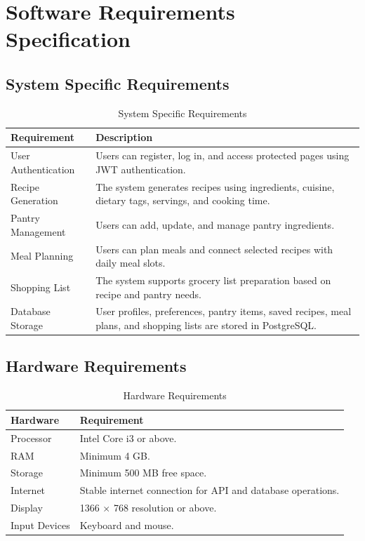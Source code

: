 \section{Software Requirements Specification}

\subsection{System Specific Requirements}
\begin{table}[h]
\centering
\caption{System Specific Requirements}
\begin{tabularx}{\textwidth}{|p{4cm}|X|}
\hline
\textbf{Requirement} & \textbf{Description} \\
\hline
User Authentication & Users can register, log in, and access protected pages using JWT authentication. \\
\hline
Recipe Generation & The system generates recipes using ingredients, cuisine, dietary tags, servings, and cooking time. \\
\hline
Pantry Management & Users can add, update, and manage pantry ingredients. \\
\hline
Meal Planning & Users can plan meals and connect selected recipes with daily meal slots. \\
\hline
Shopping List & The system supports grocery list preparation based on recipe and pantry needs. \\
\hline
Database Storage & User profiles, preferences, pantry items, saved recipes, meal plans, and shopping lists are stored in PostgreSQL. \\
\hline
\end{tabularx}
\end{table}

\subsection{Hardware Requirements}
\begin{table}[h]
\centering
\caption{Hardware Requirements}
\begin{tabularx}{\textwidth}{|p{4cm}|X|}
\hline
\textbf{Hardware} & \textbf{Requirement} \\
\hline
Processor & Intel Core i3 or above. \\
\hline
RAM & Minimum 4 GB. \\
\hline
Storage & Minimum 500 MB free space. \\
\hline
Internet & Stable internet connection for API and database operations. \\
\hline
Display & 1366 $\times$ 768 resolution or above. \\
\hline
Input Devices & Keyboard and mouse. \\
\hline
\end{tabularx}
\end{table}

